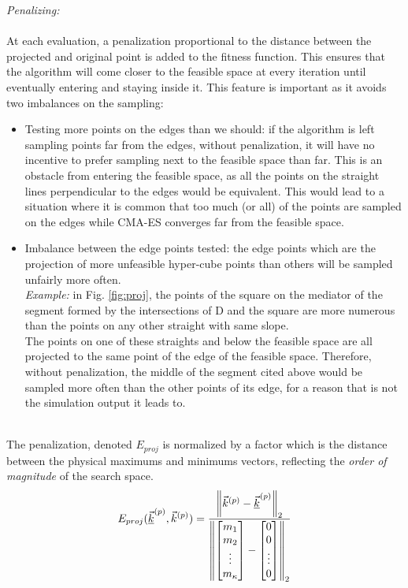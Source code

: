 \emph{Penalizing:}\\
\\
At each evaluation, a penalization proportional to the distance between the projected and original point is added to the fitness function. This ensures that the algorithm will come closer to the feasible space at every iteration until eventually entering and staying inside it. This feature is important as it avoids two imbalances on the sampling:
\begin{itemize}
	\item Testing more points on the edges than we should: if the algorithm is left sampling points far from the edges, without penalization, it will have no incentive to prefer sampling next to the feasible space than far. This is an obstacle from entering the feasible space, as all the points on the straight lines perpendicular to the edges would be equivalent. This would lead to a situation where it is common that too much (or all) of the points are sampled on the edges while CMA-ES converges far from the feasible space.
	\item Imbalance between the edge points tested: the edge points which are the projection of more unfeasible hyper-cube points than others will be sampled unfairly more often.\\
	\emph{Example:} in Fig. \ref{fig:proj}, the points of the square on the mediator of the segment formed by the intersections of D and the square are more numerous than the points on any other straight with same slope.\\
The points on one of these straights and below the feasible space are all projected to the same point of the edge of the feasible space. Therefore, without penalization, the middle of the segment cited above would be sampled more often than the other points of its edge, for a reason that is not the simulation output it leads to. 
\end{itemize}
~\\
The penalization, denoted $E_{proj}$ is normalized by a factor which is the distance between the physical maximums and minimums vectors, reflecting the \emph{order of magnitude} of the search space.
\begin{equation*}
	E_{proj}(\underline{\vec{k}}^{(p)},\vec{k}^{(p)})=\frac{\left\lVert\vec{k}^{(p)}-\underline{\vec{k}}^{(p)}\right\rVert_{2}}{\left\lVert\begin{bmatrix}m_{1}\\m_{2}\\\vdots\\m_{\kappa}\end{bmatrix}-\begin{bmatrix}0\\0\\\vdots\\0\end{bmatrix}\right\rVert_{2}}
\end{equation*}
